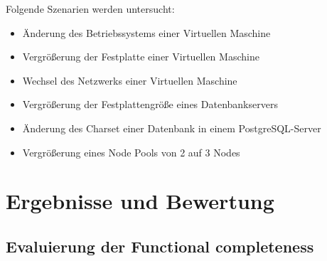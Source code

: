 \begin{spacing}{1.2}
Folgende Szenarien werden untersucht:

\begin{itemize}
  \item Änderung des Betriebssystems einer Virtuellen Maschine
  \item Vergrößerung der Festplatte einer Virtuellen Maschine
  \item Wechsel des Netzwerks
  einer Virtuellen Maschine
  \item Vergrößerung der Festplattengröße eines Datenbankservers
  \item Änderung des Charset einer Datenbank in einem PostgreSQL-Server
  \item Vergrößerung eines Node Pools von 2 auf 3 Nodes
\end{itemize}

\chapter{Ergebnisse und Bewertung}
\label{sec:ergeb}

\section{Evaluierung der Functional completeness}


\end{spacing}
